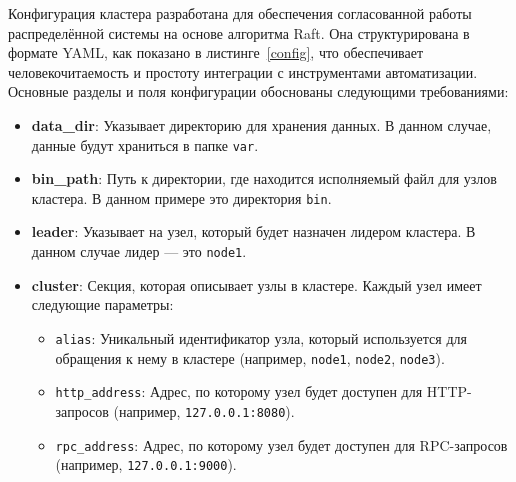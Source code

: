 Конфигурация кластера разработана для обеспечения согласованной работы распределённой
системы на основе алгоритма Raft. Она структурирована в формате YAML, как показано в
листинге~\ref{config}, что обеспечивает человекочитаемость и простоту интеграции с
инструментами автоматизации. Основные разделы и поля конфигурации обоснованы следующими
требованиями:

\begin{itemize}
    \item \textbf{data\_dir}: Указывает директорию для хранения данных. В данном случае, данные будут храниться в папке \texttt{var}.
    \item \textbf{bin\_path}: Путь к директории, где находится исполняемый файл для узлов кластера. В данном примере это директория \texttt{bin}.
    \item \textbf{leader}: Указывает на узел, который будет назначен лидером кластера. В данном случае лидер — это \texttt{node1}.
    
    \item \textbf{cluster}: Секция, которая описывает узлы в кластере. Каждый узел имеет следующие параметры:
    \begin{itemize}
        \item \texttt{alias}: Уникальный идентификатор узла, который используется для обращения к нему в кластере
              (например, \texttt{node1}, \texttt{node2}, \texttt{node3}).
        \item \texttt{http\_address}: Адрес, по которому узел будет доступен для HTTP-запросов (например, \texttt{127.0.0.1:8080}).
        \item \texttt{rpc\_address}: Адрес, по которому узел будет доступен для RPC-запросов (например, \texttt{127.0.0.1:9000}).
    \end{itemize}
\end{itemize}

